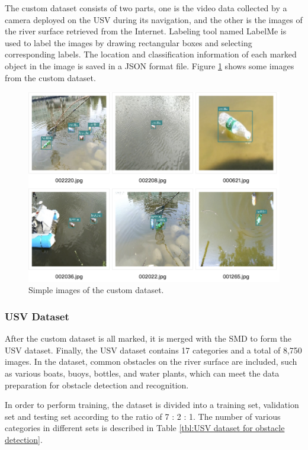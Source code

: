 \documentclass[journal,article,submit,moreauthors,pdftex]{Definitions/mdpi}
\begin{document}
The custom dataset consists of two parts, one is the video data collected by a camera deployed on the USV during its navigation, and the other is the images of the river surface retrieved from the Internet. Labeling tool named LabelMe is used to label the images by drawing rectangular boxes and selecting corresponding labels. The location and classification information of each marked object in the image is saved in a JSON format file. Figure \ref{fig:Simple images of the custom dataset} shows some images from the custom dataset. 

\begin{figure}[htbp]
\centering
\includegraphics[width=0.9\columnwidth]{images/custom-dataset-example.png}
\caption{Simple images of the custom dataset.}
\label{fig:Simple images of the custom dataset}
\end{figure}


\subsubsection{USV Dataset}
After the custom dataset is all marked, it is merged with the SMD to form the USV dataset. Finally, the USV dataset contains 17 categories and a total of 8,750 images. In the dataset, common obstacles on the river surface are included, such as various boats, buoys, bottles, and water plants, which can meet the data preparation for obstacle detection and recognition.

In order to perform training, the dataset is divided into a training set, validation set and testing set according to the ratio of 7 : 2 : 1. The number of various categories in different sets is described in Table \ref{tbl:USV dataset for obstacle detection}.
\end{document}
